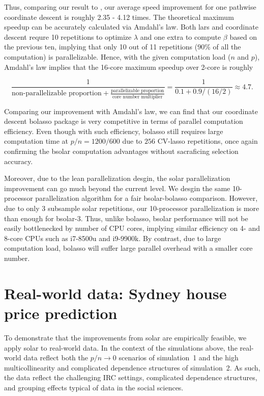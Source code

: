 \documentclass[12pt]{article}
\begin{document}
Thus, comparing our result to \citet{friedman2010regularization} , our average speed improvement for one pathwise coordinate descent is roughly 2.35 - 4.12 times. The theoretical maximum speedup can be accurately calculated via Amdahl's law. Both lars and coordinate descent requre 10 repetitions to optimize $\lambda$ and one extra to compute $\beta$ based on the previous ten, implying that only 10 out of 11 repetitions ($90\%$ of all the computation) is parallelizable. Hence, with the given computation load ($n$ and $p$), Amdahl's law implies that the 16-core maximum speedup over 2-core is roughly 

\begin{equation}
  \frac{1}{\mbox{non-parallelizable proportion} + \frac{\mbox{parallelizable proportion}}{\mbox{core number multiplier}}} = \frac{1}{0.1 + 0.9/(16/2)} \approx 4.7.
\end{equation}

\noindent
Comparing our improvement with Amdahl's law, we can find that our coordinate descent bolasso package is very competitive in terms of parallel computation efficiency. Even though with such efficiency, bolasso still requires large computation time at $p/n=1200/600$ due to $256$ CV-lasso repetitions, once again confirming the bsolar computation advantages without sacraficing selection accuracy.

Moreover, due to the lean parallelization desgin, the solar parallelization improvement can go much beyond the current level. We desgin the same 10-processor parallelization algorithm for a fair bsolar-bolasso comparison. However, due to only 3 subsample solar repetitions, our 10-processor parallelization is more than enough for bsolar-3. Thus, unlike bolasso, bsolar performance will not be easily bottlenecked by number of CPU cores, implying similar efficiency on 4- and 8-core CPUs such as i7-8500u and i9-9900k. By contrast, due to large computation load, bolasso will suffer large parallel overhead with a smaller core number.

\section{Real-world data: Sydney house price prediction\label{section:application}}

To demonstrate that the improvements from solar are empirically feasible, we apply solar to real-world data. In the context of the simulations above, the real-world data reflect both the $p/n\rightarrow0$ scenarios of simulation~1 and the high multicollinearity and complicated dependence structures of simulation~2. As such, the data reflect the challenging IRC settings, complicated dependence structures, and grouping effects typical of data in the social sciences.
\end{document}
